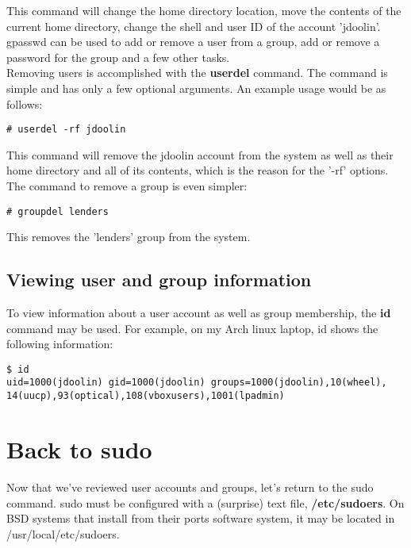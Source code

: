 This command will change the home directory location, move the contents of the current home directory, change the shell and user ID of the account 'jdoolin'.\\

gpasswd can be used to add or remove a user from a group, add or remove a password for the group and a few other tasks.\\

Removing users is accomplished with the \textbf{userdel} command.  The command is simple and has only a few optional arguments.  An example usage would be as follows:

\begin{verbatim}
# userdel -rf jdoolin
\end{verbatim}

This command will remove the jdoolin account from the system as well as their home directory and all of its contents, which is the reason for the '-rf' options.\\

The command to remove a group is even simpler:

\begin{verbatim}
# groupdel lenders
\end{verbatim}

This removes the 'lenders' group from the system.

\subsection{Viewing user and group information}

To view information about a user account as well as group membership, the \textbf{id} command may be used. For example, on my Arch linux laptop, id shows the following information:

\begin{verbatim}
$ id
uid=1000(jdoolin) gid=1000(jdoolin) groups=1000(jdoolin),10(wheel),
14(uucp),93(optical),108(vboxusers),1001(lpadmin)
\end{verbatim}

\section{Back to sudo}

Now that we've reviewed user accounts and groups, let's return to the sudo command.  sudo must be configured with a (surprise) text file, \textbf{/etc/sudoers}.  On BSD systems that install from their ports software system, it may be located in /usr/local/etc/sudoers.\\


